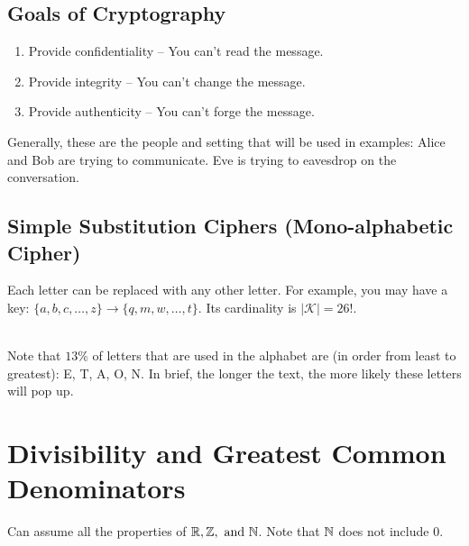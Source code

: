 \subsection{Goals of Cryptography}

\begin{enumerate}
    \item Provide confidentiality -- You can't read the message.
    \item Provide integrity -- You can't change the message.
    \item Provide authenticity -- You can't forge the message.
\end{enumerate}

Generally, these are the people and setting that will be used in examples: Alice and Bob are trying to communicate. Eve is trying to eavesdrop on the conversation. \\

\subsection{Simple Substitution Ciphers (Mono-alphabetic Cipher)}

Each letter can be replaced with any other letter. For example, you may have a key: $\{a,b,c,\dots,z\} \rightarrow \{q,m,w,\dots,t\}$. Its cardinality is $|\mathcal{K}| = 26!$. \\

 \\


 Note that $13\%$ of letters that are used in the alphabet are (in order from least to greatest): E, T, A, O, N. In brief, the longer the text, the more likely these letters will pop up.

\section{Divisibility and Greatest Common Denominators}

Can assume all the properties of $\mathbb{R}, \mathbb{Z}, \text{ and } \mathbb{N}$. Note that $\mathbb{N}$ does not include 0. \\


